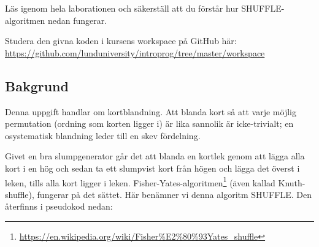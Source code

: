 

\Lab{\LabWeekSIX}

\begin{Goals}

\end{Goals}

\begin{Preparations}
\item {}
\item Läs igenom hela laborationen och säkerställ att du förstår hur SHUFFLE-algoritmen nedan fungerar.

\item Studera den givna koden i kursens workspace på GitHub här:\\
\url{https://github.com/lunduniversity/introprog/tree/master/workspace}

\end{Preparations}

\subsection{Bakgrund}\label{knuth-shuffle}

Denna uppgift handlar om kortblandning. Att blanda kort så att varje möjlig permutation (ordning som korten ligger i) är lika sannolik är icke-trivialt; en osystematisk blandning leder till en skev fördelning.

Givet en bra slumpgenerator går det att blanda en kortlek genom att lägga alla kort i en hög och sedan ta ett slumpvist kort från högen och lägga det överst i leken, tills alla kort ligger i leken. Fisher-Yates-algoritmen\footnote{\href{https://en.wikipedia.org/wiki/Fisher\%E2\%80\%93Yates_shuffle}{https://en.wikipedia.org/wiki/Fisher\%E2\%80\%93Yates\_shuffle}} (även kallad Knuth-shuffle), fungerar på det sättet. Här benämner vi denna algoritm SHUFFLE. Den återfinns i pseudokod nedan:

\begin{algorithm}[H]
\end{algorithm}

